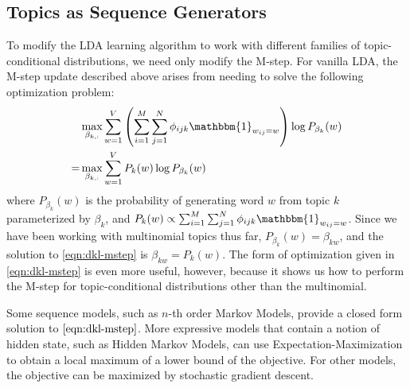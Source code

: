 \documentclass[letterpaper]{article}
\begin{document}
\subsection{Topics as Sequence Generators}
To modify the LDA learning algorithm to work with different families of topic-conditional distributions, we need only modify the M-step. For vanilla LDA, the M-step update described above arises from needing to solve the following optimization problem:
\begin{align}
    &\max_{\beta_{k,:}} \sum_{w=1}^V \left(\sum_{i=1}^M \sum_{j=1}^N \phi_{ijk}\mathbbm{1}_{w_{ij} = w}\right) \log P_{\beta_k}(w)\\
    = &\max_{\beta_{k,:}} \sum_{w=1}^V P_k(w) \log P_{\beta_k}(w)\label{eqn:dkl-mstep}
\end{align}
where $P_{\beta_k}(w)$ is the probability of generating word $w$ from topic $k$ parameterized by $\beta_k$, and $P_k(w) \propto \sum_{i=1}^M \sum_{j=1}^N \phi_{ijk}\mathbbm{1}_{w_{ij} = w}$. Since we have been working with multinomial topics thus far, $P_{\beta_k}(w) = \beta_{kw}$, and the solution to \eqref{eqn:dkl-mstep} is $\beta_{kw} = P_k(w)$. The form of optimization given in \eqref{eqn:dkl-mstep} is even more useful, however, because it shows us how to perform the M-step for topic-conditional distributions other than the multinomial.

Some sequence models, such as $n$-th order Markov Models, provide a closed form solution to $\eqref{eqn:dkl-mstep}$. More expressive models that contain a notion of hidden state, such as Hidden Markov Models, can use Expectation-Maximization to obtain a local maximum of a lower bound of the objective. For other models, the objective can be maximized by stochastic gradient descent.
\end{document}
